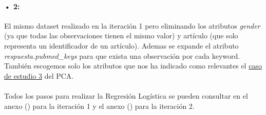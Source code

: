 \paragraph{• 2: } El mismo dataset realizado en la iteración 1 pero eliminando los atributos \textit{gender} (ya que todas las observaciones tienen el mismo valor) y artículo (que solo representa un identificador de un artículo). Ademas se expande el atributo \textit{respuesta.pubmed\_keys} para que exista una observación por cada keyword. También escogemos solo los atributos que nos ha indicado como relevantes el \hyperref[result:pca_case3]{caso de estudio 3} del PCA.

\paragraph{}
Todos los pasos para realizar la Regresión Logística se pueden consultar en el anexo () para la iteración 1 y el anexo () para la iteración 2.
